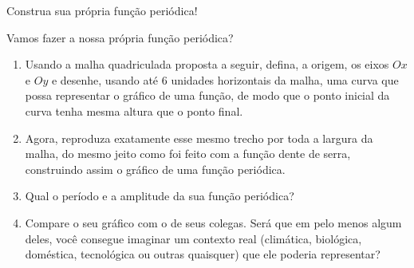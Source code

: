 \begin{task}{Construa sua própria função periódica!}
\label{trig-ativ5}

Vamos fazer a nossa própria função periódica?

\begin{enumerate}
\item Usando a malha quadriculada proposta a seguir, defina, a origem, os eixos $Ox$ e $Oy$ e desenhe, usando até $6$ unidades horizontais da malha, uma curva que possa representar o gráfico de uma função, de modo que o ponto inicial da curva tenha mesma altura que o ponto final.
\item Agora, reproduza exatamente esse mesmo trecho por toda a largura da malha, do mesmo jeito como foi feito com a função dente de serra, construindo assim o gráfico de uma função periódica.
\item Qual o período e a amplitude da sua função periódica?
\item Compare o seu gráfico com o de seus colegas. Será que em pelo menos algum deles, você consegue imaginar um contexto real (climática, biológica, doméstica, tecnológica ou outras quaisquer) que ele poderia representar?

\end{enumerate}


\begin{figure}[H]
\centering



\end{figure}
\end{task}

\clearpage

